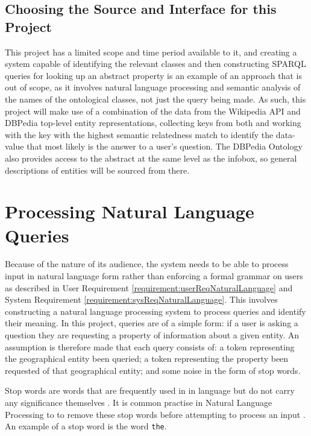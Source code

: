 \documentclass[authoryearcitations]{UoYCSproject}
\begin{document}
\subsection{Choosing the Source and Interface for this Project}
This project has a limited scope and time period available to it, and creating a system capable of identifying the relevant classes and then constructing SPARQL queries for looking up an abstract property is an example of an approach that is out of scope, as it involves natural language processing and semantic analysis of the names of the ontological classes, not just the query being made.  As such, this project will make use of a combination of the data from the Wikipedia API and DBPedia top-level entity representations, collecting keys from both and working with the key with the highest semantic relatedness match to identify the data-value that most likely is the answer to a user's question.  The DBPedia Ontology also provides access to the abstract at the same level as the infobox, so general descriptions of entities will be sourced from there.

\section{Processing Natural Language Queries}
Because of the nature of its audience, the system needs to be able to process input in natural language form rather than enforcing a formal grammar on users as described in User Requirement \ref{requirement:userReqNaturalLanguage} and System Requirement \ref{requirement:sysReqNaturalLanguage}. This involves constructing a natural language processing system to process queries and identify their meaning. In this project, queries are of a simple form: if a user is asking a question they are requesting a property of information about a given entity. An assumption is therefore made that each query consists of: a token representing the geographical entity been queried; a token representing the property been requested of that geographical entity; and some noise in the form of stop words.

Stop words are words that are frequently used in in language but do not carry any significance themselves \cite{dataMiningStopWords}. It is common practise in Natural Language Processing to to remove these stop words before attempting to process an input \cite{dataMiningStopWords}. An example of a stop word is the word \texttt{the}.
\end{document}
